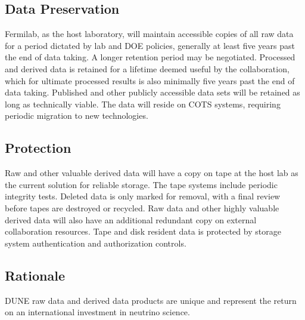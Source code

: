 \documentclass[../main-v1.tex]{subfiles}
\begin{document}
\subsection{Data Preservation}
Fermilab, as the host laboratory, will maintain accessible copies of all raw data for a period dictated by lab and DOE policies, generally at least five years past the end of data taking.  A longer retention period may be negotiated.  Processed and derived data is retained for a lifetime deemed useful by the collaboration, which for ultimate processed results is also minimally five years past the end of data taking.  Published and other publicly accessible data sets will be retained as long as technically viable. The data will reside on COTS systems, requiring periodic migration to new technologies.

\subsection{Protection}
Raw and other valuable derived data will have a copy on tape at the host lab as the current solution for reliable storage.  The tape systems include periodic integrity tests.  Deleted data is only marked for removal, with a final review before tapes are destroyed or recycled.  Raw data and other highly valuable derived data will also have an additional redundant copy on external collaboration resources.  Tape and disk resident data is protected by storage system authentication and authorization controls.

\subsection{Rationale}
DUNE raw data and derived data products are unique and represent the return on an international investment in neutrino science.

\end{document}
